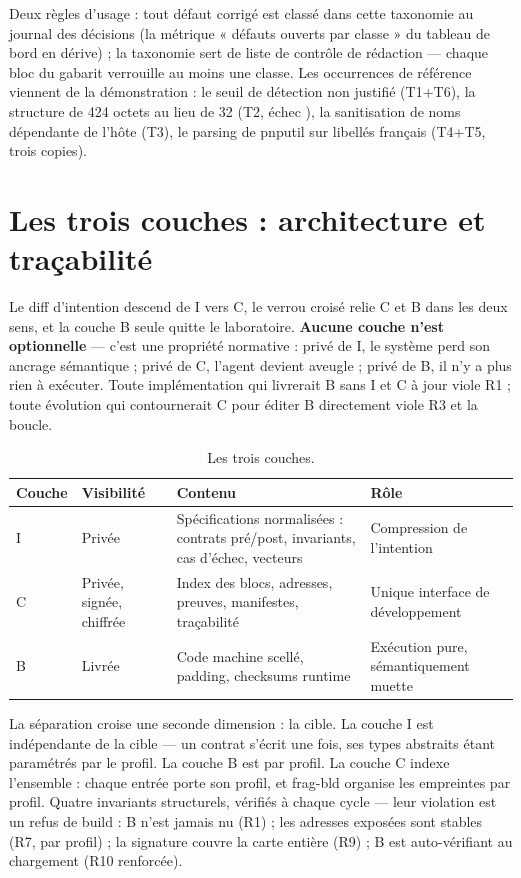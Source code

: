 Deux règles d’usage : tout défaut corrigé est classé dans cette taxonomie au journal des
décisions (la métrique « défauts ouverts par classe » du tableau de bord en dérive) ; la
taxonomie sert de liste de contrôle de rédaction — chaque bloc du gabarit verrouille au
moins une classe. Les occurrences de référence viennent de la démonstration : le seuil de
détection non justifié (T1+T6), la structure  de 424 octets au
lieu de 32 (T2, échec ), la sanitisation de noms dépendante de l’hôte (T3), le
parsing de pnputil sur libellés français (T4+T5, trois copies).

\section{Les trois couches : architecture et traçabilité}\label{sec:couches}

Le diff d’intention descend de I vers C, le verrou croisé relie C et B dans les deux sens,
et la couche B seule quitte le laboratoire. \textbf{Aucune couche n’est optionnelle} —
c’est une propriété normative : privé de I, le système perd son ancrage sémantique ; privé
de C, l’agent devient aveugle ; privé de B, il n’y a plus rien à exécuter. Toute
implémentation qui livrerait B sans I et C à jour viole R1 ; toute évolution qui
contournerait C pour éditer B directement viole R3 et la boucle.

\begin{table}[htbp]
\centering\small
\caption{Les trois couches.}
\label{tab:couches}
\begin{tabularx}{\textwidth}{@{}l l Y Y@{}}
\toprule
\textbf{Couche} & \textbf{Visibilité} & \textbf{Contenu} & \textbf{Rôle} \\
\midrule
I & Privée & Spécifications normalisées : contrats pré/post, invariants, cas d’échec,
vecteurs & Compression de l’intention \\
C & Privée, signée, chiffrée & Index des blocs, adresses, preuves, manifestes,
traçabilité & Unique interface de développement \\
B & Livrée & Code machine scellé, padding, checksums runtime & Exécution pure,
sémantiquement muette \\
\bottomrule
\end{tabularx}
\end{table}

La séparation croise une seconde dimension : la cible. La couche I est indépendante de la
cible — un contrat s’écrit une fois, ses types abstraits étant paramétrés par le profil.
La couche B est par profil. La couche C indexe l’ensemble : chaque entrée porte son
profil, et frag-bld organise les empreintes par profil. Quatre invariants structurels,
vérifiés à chaque cycle — leur violation est un refus de build : B n’est jamais nu (R1) ;
les adresses exposées sont stables (R7, par profil) ; la signature couvre la carte entière
(R9) ; B est auto-vérifiant au chargement (R10 renforcée).

